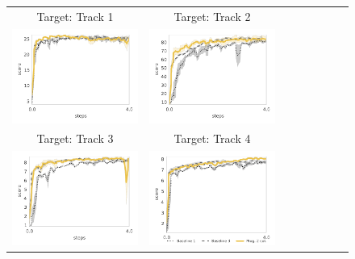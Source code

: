 \begin{figure}
     \begin{tabular}{cccccccc}
	Target: Track 1 & Target: Track 2 \\
        \includegraphics[width=.44\textwidth]{figures/app_plots/lab/smy1/seek_track_01} &
        \includegraphics[width=.44\textwidth]{figures/app_plots/lab/smy1/seek_track_02} \\

	Target: Track 3 & Target: Track 4 \\
        \includegraphics[width=.44\textwidth]{figures/app_plots/lab/smy1/seek_track_03} &
        \includegraphics[width=.44\textwidth]{figures/app_plots/lab_legend/smy1/seek_track_04} \\


\end{tabular}
\end{figure}
